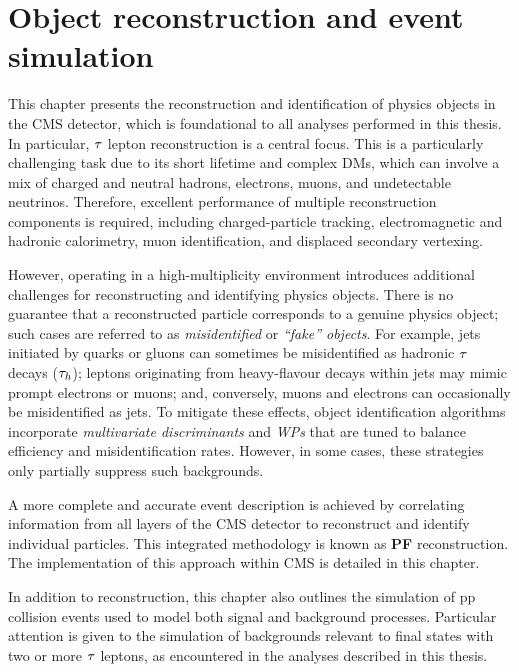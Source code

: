 \chapter{Object reconstruction and event simulation}
\thispagestyle{plain}  %
\pagestyle{chapterpages}
\label{Section:Chapter4}
\minitoc

This chapter presents the reconstruction and identification of physics objects in the \ac{CMS} detector, which is foundational to all analyses performed in this thesis. In particular, $\tau$ lepton reconstruction is a central focus. This is a particularly challenging task due to its short lifetime and complex \acp{DM}, which can involve a mix of charged and neutral hadrons, electrons, muons, and undetectable neutrinos. Therefore, excellent performance of multiple reconstruction components is required, including charged-particle tracking, electromagnetic and hadronic calorimetry, muon identification, and displaced secondary vertexing.

However, operating in a high-multiplicity environment introduces additional challenges for reconstructing and identifying physics objects. There is no guarantee that a reconstructed particle corresponds to a genuine physics object; such cases are referred to as \textit{misidentified} or \textit{``fake'' objects}. For example, jets initiated by quarks or gluons can sometimes be misidentified as hadronic $\tau$ decays ($\tau_h$); leptons originating from heavy-flavour decays within jets may mimic prompt electrons or muons; and, conversely, muons and electrons can occasionally be misidentified as jets. To mitigate these effects, object identification algorithms incorporate \textit{multivariate discriminants} and \textit{\acp{WP}} that are tuned to balance efficiency and misidentification rates. However, in some cases, these strategies only partially suppress such backgrounds.

A more complete and accurate event description is achieved by correlating information from all layers of the \ac{CMS} detector to reconstruct and identify individual particles. This integrated methodology is known as \textbf{\ac{PF}} reconstruction. The implementation of this approach within \ac{CMS} is detailed in this chapter.

In addition to reconstruction, this chapter also outlines the simulation of pp collision events used to model both signal and background processes. Particular attention is given to the simulation of backgrounds relevant to final states with two or more $\tau$ leptons, as encountered in the analyses described in this thesis.

